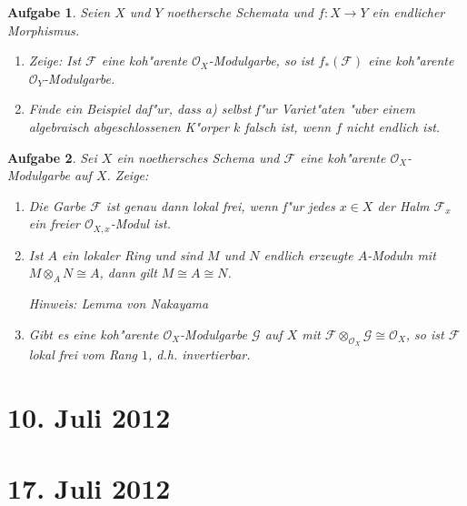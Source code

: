 \documentclass[paper = A4, fontsize=12pt, numbers=noendperiod, chapterprefix=true]{scrbook}
\theoremstyle{break}
\newtheorem{Aufg}{Aufgabe}
\theoremstyle{nonumberbreak}
\theoremstyle{nonumberplain}
\newcommand{\calO}{\mathcal{O}}
\newcommand{\F}{\mathcal{F}} %
\newcommand{\G}{\mathcal{G}} %
\begin{document}
\begin{Aufg}
Seien $X$ und $Y$ noethersche Schemata und $f\colon X \to Y$ ein endlicher Morphismus. 
\begin{enumerate}%
 \item Zeige: Ist $\mathcal{F}$ eine koh"arente $\mathcal{O}_X$-Modulgarbe, so ist $f_*(\mathcal{F})$ eine koh"arente $\mathcal{O}_Y$-Modulgarbe.
 \item Finde ein Beispiel daf"ur, dass a) selbst f"ur Variet"aten "uber einem algebraisch abgeschlossenen K"orper $k$ falsch ist, wenn $f$ nicht endlich ist.
\end{enumerate}
\end{Aufg}


\begin{Aufg}
Sei $X$ ein noethersches Schema und $\F$ eine koh"arente $\mathcal{O}_X$-Modulgarbe auf $X$. Zeige:
\begin{enumerate}%
 \item Die Garbe $\F$ ist genau dann lokal frei, wenn f"ur jedes $x \in X$ der Halm $\F_x$ %
 ein freier $\calO_{X,x}$-Modul ist.
 \item Ist $A$ ein lokaler Ring und sind $M$ und $N$ endlich erzeugte $A$-Moduln mit $M \otimes_A N \cong A$, dann gilt $M \cong A \cong N$. 
 
 \textit{Hinweis: Lemma von Nakayama}
 \item Gibt es eine koh"arente $\mathcal{O}_X$-Modulgarbe $\G$ auf $X$ mit $\F \otimes_{\calO_X} \G \cong \calO_X$, so ist $\F$ lokal frei vom Rang $1$, d.h. invertierbar.
\end{enumerate}
\end{Aufg}


\newpage
\section{10. Juli 2012}
\setcounter{Aufg}{0}
\setcounter{Loes}{0}

\newpage
\section{17. Juli 2012}
\setcounter{Aufg}{0}
\setcounter{Loes}{0}

\end{document}

